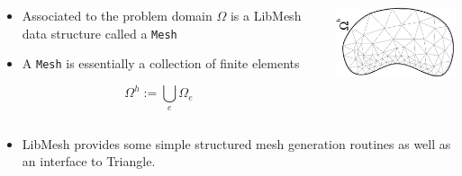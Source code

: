 \begin{frame}
  \begin{columns}[t]
    \begin{block}{}%
      \begin{itemize}
      \item{
	Associated to the problem domain $\Omega$ is a LibMesh data
	structure called a \texttt{Mesh}
      }
	
      \item{A \texttt{Mesh} is essentially
	a collection of finite elements}
      \end{itemize}
      \begin{equation}
	\label{eqn:discretized_domain}
	\nonumber
	\Omega^h:=\bigcup_e \Omega_e
      \end{equation}
    \end{block}
      \begin{center}
	\includegraphics[width=2in,angle=-90]{figures/discretized_domain}
      \end{center}
  \end{columns}
  {
  \begin{itemize}
    \item{LibMesh provides some simple structured mesh generation routines
      as well as an interface to Triangle.}
  \end{itemize}
  }
\end{frame}


